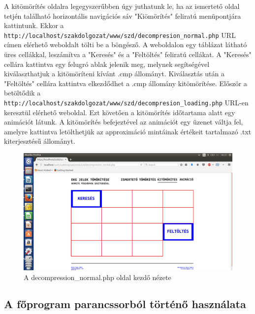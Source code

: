 \documentclass[oneside,titlepage,12pt,a4paper]{report}
\begin{document}
A kitömörítés oldalra legegyszerűbben úgy juthatunk le, ha az ismertető oldal tetjén található horizontális navigációs sáv "Kiömörítés" feliratú menüpontjára kattintunk. Ekkor a \texttt{http://localhost/szakdolgozat/www/szd/decompresion\_normal.php} \linebreak URL címen elérhető weboldalt tölti be a böngésző. A weboldalon egy táblázat látható üres cellákkal, leszámítva a "Keresés" és a "Feltöltés" feliratú cellákat. A "Keresés" cellára kattintva egy felugró ablak jelenik meg, melynek segítségével kiválaszthatjuk a kitömöríteni kívánt .cmp állományt. Kiválasztás után a "Feltöltés" cellára kattintva elkezdődhet a .cmp állomány kitömörítése. Először a betöltődik a \texttt{http://localhost/szakdolgozat/www/szd/decompresion\_loading.php} URL-en \linebreak keresztül elérhető weboldal. Ezt követően a kitömörítés időtartama alatt egy animációt látunk. A kitömörítés befejeztével az animációt egy üzenet váltja fel, amelyre kattintva letölthetjük az approximáció mintáinak értékeit tartalmazó .txt kiterjesztésű állományt.

\begin{figure}[H]
\begin{center}
  \includegraphics[width=150mm]{./Abrak/WWW/kitom_alap.png}
  \caption{A decompression\_normal.php oldal kezdő nézete}
\end{center}
\end{figure}

\subsection*{A főprogram parancssorból történő használata} \label{sec:hosszu}
\end{document}
